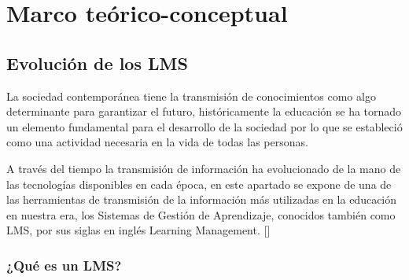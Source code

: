 \chapter{Marco teórico-conceptual}\label{chapter:state-of-the-art}

\section{Evolución de los LMS}
La sociedad contemporánea tiene la transmisión de conocimientos como algo determinante para garantizar el futuro, históricamente la educación se ha tornado un elemento fundamental para el desarrollo de la sociedad por lo que se estableció como una actividad necesaria en la vida de todas las personas.

A través del tiempo la transmisión de información ha evolucionado de la mano de las tecnologías disponibles en cada época, en este apartado se expone de una de las herramientas de transmisión de la información más utilizadas en la educación en nuestra era, los Sistemas de Gestión de Aprendizaje, conocidos también como LMS, por sus siglas en inglés Learning Management. [\cite{bit4learn}]

\subsection{¿Qué es un LMS?}

